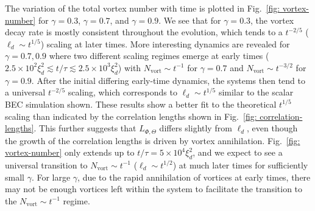 The variation of the total vortex number with time is plotted in
Fig.~\ref{fig: vortex-number} for \(\gamma=0.3\), \(\gamma=0.7\), and
\(\gamma=0.9\).
We see that for \(\gamma=0.3\), the vortex decay rate is mostly consistent
throughout the evolution, which tends to a \(t^{-2/5}\)
(\(\ell_d \sim t^{1/5}\)) scaling at later times.
More interesting dynamics are revealed for \(\gamma=0.7, 0.9\) where two
different scaling regimes emerge at early times
(\(2.5\times10^2\xi_d^2 \lesssim t/\tau \lesssim 2.5\times10^3\xi_d^2\)) with
\(N_\mathrm{vort} \sim t^{-1}\) for \(\gamma=0.7\) and
\(N_\mathrm{vort} \sim t^{-3/2}\) for \(\gamma=0.9\).
After the initial differing early-time dynamics, the systems then tend to a
universal \(t^{-2/5}\) scaling, which corresponds to \(\ell_d\sim t^{1/5}\)
similar to the scalar BEC simulation shown.
These results show a better fit to the theoretical \(t^{1/5}\) scaling than
indicated by the correlation lengths shown in
Fig.~\ref{fig: correlation-lengths}.
This further suggests that \(L_{\Phi,\Theta}\) differs slightly from \(\ell_d\),
even though the growth of the correlation lengths is driven by vortex
annihilation.
Fig.~\ref{fig: vortex-number} only extends up to \(t/\tau=5\times 10^4\xi_d^2\),
and we expect to see a universal transition to
\(N_\mathrm{vort}\sim t^{-1}\) (\(\ell_d\sim t^{1/2}\)) at much later times for
sufficiently small \(\gamma \).
For large \(\gamma \), due to the rapid annihilation of vortices at early times,
there may not be enough vortices left within the system to facilitate the
transition to the \(N_\mathrm{vort} \sim t^{-1}\) regime.

